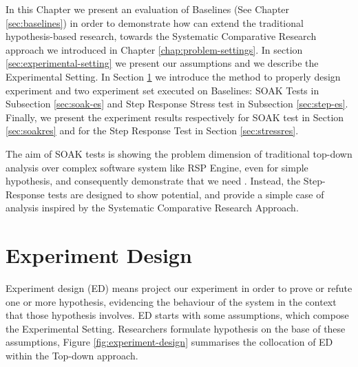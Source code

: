 

In this Chapter we present an evaluation of \name Baselines (See Chapter \ref{sec:baselines}) in order to demonstrate how \name can extend the traditional hypothesis-based research, towards the Systematic Comparative Research approach we introduced in Chapter \ref{chap:problem-settings}. In section \ref{sec:experimental-setting} we present our assumptions and we describe the Experimental Setting. In Section \ref{sec:experiment-design} we introduce the method to properly design experiment and two experiment set executed on \name Baselines: SOAK Tests in Subsection \ref{sec:soak-es} and Step Response Stress test in Subsection \ref{sec:step-es}. Finally, we present the experiment results respectively for SOAK test in Section \ref{sec:soakres} and for the Step Response Test in Section \ref{sec:stressres}.

The aim of SOAK tests is showing the problem dimension of traditional top-down analysis over complex software system like RSP Engine, even for simple hypothesis, and consequently demonstrate that we need \namens. Instead, the Step-Response tests are designed to show \name potential, and provide a simple case of analysis inspired by the Systematic Comparative Research Approach.

\section{Experiment Design}\label{sec:experiment-design}

Experiment design (ED) means project our experiment in order to prove or refute one or more hypothesis, evidencing the behaviour of the system in the context that those hypothesis involves. ED starts with some assumptions, which compose the  Experimental Setting. Researchers formulate hypothesis on the base of these assumptions, Figure \ref{fig:experiment-design} summarises the collocation of ED within the Top-down approach.

